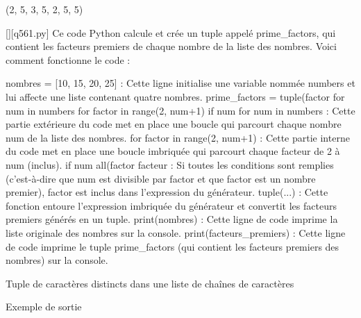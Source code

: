 (2, 5, 3, 5, 2, 5, 5)
        \par
        \begin{solution}
            \renewcommand{\nomfichier}{q561.py}
            \pythonfile{\chemincode \nomfichier}[][\nomfichier]
            Ce code Python calcule et crée un tuple appelé prime_factors, qui contient les facteurs premiers de chaque nombre de la liste des nombres. Voici comment fonctionne le code :

    nombres = [10, 15, 20, 25] : Cette ligne initialise une variable nommée numbers et lui affecte une liste contenant quatre nombres.
    prime_factors = tuple(factor for num in numbers for factor in range(2, num+1) if num %
        for num in numbers : Cette partie extérieure du code met en place une boucle qui parcourt chaque nombre num de la liste des nombres.
        for factor in range(2, num+1) : Cette partie interne du code met en place une boucle imbriquée qui parcourt chaque facteur de 2 à num (inclus).
        if num %
        all(factor %
        facteur : Si toutes les conditions sont remplies (c'est-à-dire que num est divisible par factor et que factor est un nombre premier), factor est inclus dans l'expression du générateur.
        tuple(...) : Cette fonction entoure l'expression imbriquée du générateur et convertit les facteurs premiers générés en un tuple.
    print(nombres) : Cette ligne de code imprime la liste originale des nombres sur la console.
    print(facteurs_premiers) : Cette ligne de code imprime le tuple prime_factors (qui contient les facteurs premiers des nombres) sur la console.
        \end{solution}
        

        \question
        Tuple de caractères distincts dans une liste de chaînes de caractères

Exemple de sortie

